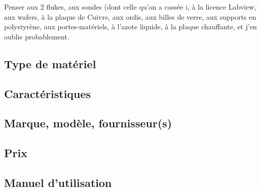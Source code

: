 Penser aux 2 flukes, aux sondes (dont celle qu'on a cassée ^^),
à la licence Labview, aux wafers, à la plaque de Cuivre, aux ordis, 
aux billes de verre, aux supports en polystyrène, aux portes-matériels, 
à l'azote liquide, à la plaque chauffante, et j'en oublie probablement.

\subsection{Type de matériel}
\subsection{Caractéristiques}
\subsection{Marque, modèle, fournisseur(s)}
\subsection{Prix}
\subsection{Manuel d'utilisation}

